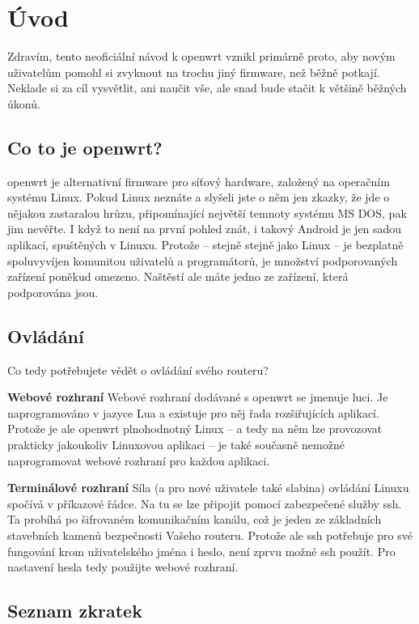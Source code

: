 \section*{Úvod}
Zdravím, tento neoficiální návod k \gls{openwrt} vznikl primárně proto,
aby novým uživatelům pomohl si zvyknout na trochu jiný firmware, než běžně
potkají. Neklade si za cíl vysvětlit, ani naučit vše, ale snad bude
stačit k většině běžných úkonů.

\subsection*{Co to je \gls{openwrt}?}
\gls{openwrt} je alternativní firmware pro síťový hardware, založený na
operačním systému Linux. Pokud Linux neznáte a slyšeli jste o něm jen
zkazky, že jde o nějakou zastaralou hrůzu, připomínající největší temnoty
systému MS DOS, pak jim nevěřte. I když to není na první pohled znát, i
takový Android je jen sadou aplikací, spuštěných v Linuxu. Protože -- stejně
stejně jako Linux -- je bezplatně spoluvyvíjen komunitou uživatelů a programátorů,
je množství podporovaných zařízení poněkud omezeno. Naštěstí ale máte jedno
ze zařízení, která podporována jsou.

\subsection*{Ovládání}
Co tedy potřebujete vědět o ovládání svého routeru?
\begin{description}
\item{\textbf{Webové rozhraní}}
Webové rozhraní dodávané s \gls{openwrt} se jmenuje \gls{luci}.
Je naprogramováno v jazyce Lua a existuje pro něj řada
rozšiřujících aplikací. Protože je ale \gls{openwrt} plnohodnotný Linux
-- a tedy na něm lze provozovat prakticky jakoukoliv Linuxovou aplikaci --
je také současně nemožné naprogramovat webové rozhraní pro každou aplikaci.
\item{\textbf{Terminálové rozhraní}}
Síla (a pro nové uživatele také slabina) ovládání Linuxu spočívá v příkazové
řádce. Na tu se lze připojit pomocí zabezpečené služby \gls{ssh}. Ta probíhá
po šifrovaném komunikačním kanálu, což je jeden ze základních stavebních
kamenů bezpečnosti Vašeho routeru. Protože ale ssh potřebuje pro své fungování
krom uživatelského jména i heslo, není zprvu možné ssh použít. Pro nastavení
hesla tedy použijte webové rozhraní.
\end{description}

\subsection*{Seznam zkratek}
\printglossaries
